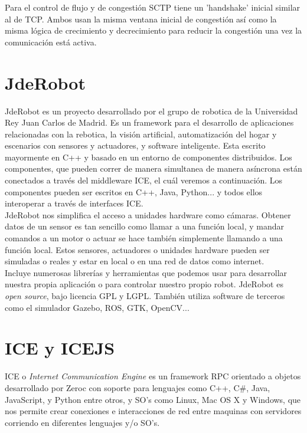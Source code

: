 Para el control de flujo y de congestión SCTP tiene un 'handshake' inicial similar al de TCP. Ambos usan la misma ventana inicial de congestión así como la misma lógica de crecimiento y decrecimiento para reducir la congestión una vez la comunicación está activa.\\


\section{JdeRobot}

JdeRobot es un proyecto desarrollado por el grupo de robotica de la Universidad Rey Juan Carlos de Madrid. Es un framework para el desarrollo de aplicaciones relacionadas con la rebotica, la visión artificial, automatización del hogar y escenarios con sensores y actuadores, y software inteligente. Esta escrito mayormente en C++ y basado en un entorno de componentes distribuidos. Los componentes, que pueden correr de manera simultanea de manera asíncrona están conectados a través del middleware ICE, el cuál veremos a continuación. Los componentes pueden ser escritos en C++, Java, Python... y todos ellos interoperar a través de interfaces ICE.\\

JdeRobot nos simplifica el acceso a unidades hardware como cámaras. Obtener datos de un sensor es tan sencillo como llamar a una función local, y mandar comandos a un motor o actuar se hace también simplemente llamando a una función local. Estos sensores, actuadores o unidades hardware pueden ser simuladas o reales y estar en local o en una red de datos como internet.\\

Incluye numerosas librerías y herramientas que podemos usar para desarrollar nuestra propia aplicación o para controlar nuestro propio robot. JdeRobot es \textit{open source}, bajo licencia GPL y LGPL. También utiliza software de terceros como el simulador Gazebo, ROS, GTK, OpenCV...\\

\section{ICE y ICEJS}

ICE o \textit{Internet Communication Engine} es un framework RPC orientado a objetos desarrollado por Zeroc con soporte para lenguajes como C++, C\#, Java, JavaScript, y Python entre otros, y SO's como Linux, Mac OS X y Windows, que nos permite crear conexiones e interacciones de red entre maquinas con servidores corriendo en diferentes lenguajes y/o SO's.\\

